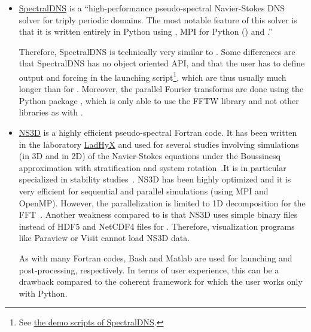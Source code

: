 \documentclass{../jors}
\begin{document}
\begin{itemize}
\item \href{https://github.com/spectralDNS/spectralDNS}{SpectralDNS}
\citep{mortensen_spectraldns2016} is a ``high-performance pseudo-spectral
Navier-Stokes DNS solver for triply periodic domains. The most notable feature of
this solver is that it is written entirely in Python using \Numpy, MPI
for Python () and .''

Therefore, SpectralDNS is technically very similar to .
%
Some differences are that SpectralDNS has no object oriented API, and that the user
has to define output and forcing in the launching script\footnote{See
\href{https://github.com/spectralDNS/spectralDNS/tree/master/demo}{the demo
scripts of SpectralDNS}.}, which are thus usually much longer than for
.
%
Moreover, the parallel Fourier transforms are done using the Python package
\href{https://github.com/spectralDNS/mpiFFT4py}{}, which is only
able to use the FFTW library and not other libraries as with 
\citep[][]{fluidfft}.

\item \href{https://bitbucket.org/paugier/ns3d}{NS3D} is a highly efficient
pseudo-spectral Fortran code.
%
It has been written in the laboratory
\href{https://www.ladhyx.polytechnique.fr}{LadHyX} and used for several studies
involving simulations (in 3D and in 2D) of the Navier-Stokes equations under the
Boussinesq approximation with stratification and system
rotation~\cite[][]{DeloncleBillantChomaz2008}.It is in particular specialized in
stability studies~\cite[][]{BillantDeloncleChomazOtheguy2010}.
%
NS3D has been highly optimized and it is very efficient for sequential and
parallel simulations (using MPI and OpenMP).  However, the parallelization is
limited to 1D decomposition for the FFT~\cite[][]{fluidfft}.
%
Another weakness compared to  is that NS3D uses simple binary files
instead of HDF5 and NetCDF4 files for .  Therefore, visualization
programs like Paraview or Visit cannot load NS3D data.

As with many Fortran codes, Bash and Matlab are used for launching and
post-processing, respectively.
%
In terms of user experience, this can be a drawback compared to the coherent
framework  for which the user works only with Python.


\end{itemize}
\end{document}
